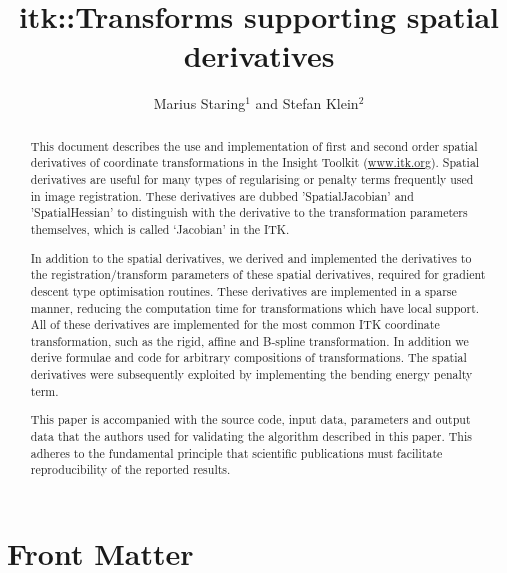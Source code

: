 \documentclass{InsightArticle}
\title{itk::Transforms supporting spatial derivatives}
\author{Marius Staring$^{1}$ and Stefan Klein$^{2}$}
\newcommand{\IJhandlerIDnumber}{1338}
\begin{document}
%
%
\IJhandlefooter{\IJhandlerIDnumber}


\ifpdf
\else
\fi


\maketitle


\ifhtml
\chapter*{Front Matter\label{front}}
\fi


\begin{abstract}
\noindent This document describes the use and implementation of
first and second order spatial derivatives of coordinate
transformations in the Insight Toolkit (\url{www.itk.org}). Spatial
derivatives are useful for many types of regularising or penalty
terms frequently used in image registration. These derivatives are
dubbed 'SpatialJacobian' and 'SpatialHessian' to distinguish with
the derivative to the transformation parameters themselves, which is
called `Jacobian' in the ITK.

In addition to the spatial derivatives, we derived and implemented
the derivatives to the registration/transform parameters of these
spatial derivatives, required for gradient descent type optimisation
routines. These derivatives are implemented in a sparse manner,
reducing the computation time for transformations which have local
support. All of these derivatives are implemented for the most
common ITK coordinate transformation, such as the rigid, affine and
B-spline transformation. In addition we derive formulae and code for
arbitrary compositions of transformations. The spatial derivatives
were subsequently exploited by implementing the bending energy
penalty term.

This paper is accompanied with the source code, input data,
parameters and output data that the authors used for validating the
algorithm described in this paper. This adheres to the fundamental
principle that scientific publications must facilitate
reproducibility of the reported results.
\end{abstract}
\end{document}
